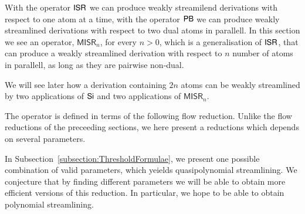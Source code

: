 \newcommand{\MISR}{\mathsf{MISR}}

With the operator $\mathsf{ISR}$ we can produce weakly streamilend derivations with respect to one atom at a time, with the operator $\mathsf{PB}$ we can produce weakly streamlined derivations with respect to two dual atoms in parallell. In this section we see an operator, $\MISR_n$, for every $n>0$, which is a generalisation of $\mathsf{ISR}$, that can produce a weakly streamlined derivation with respect to $n$ number of atoms in parallell, as long as they are pairwise non-dual.

We will see later how a derivation containing $2n$ atoms can be weakly streamlined by two applications of $\mathsf{Si}$ and two applications of $\MISR_n$.

The operator is defined in terms of the following flow reduction. Unlike the flow reductions of the preceeding sections, we here present a reductions which depends on several parameters.

In Subsection~\vref{subsection:ThresholdFormulae}, we present one possible combination of valid parameters, which yeields quasipolynomial streamlining. We conjecture that by finding different parameters we will be able to obtain more efficient versions of this reduction. In particular, we hope to be able to obtain polynomial streamlining.


